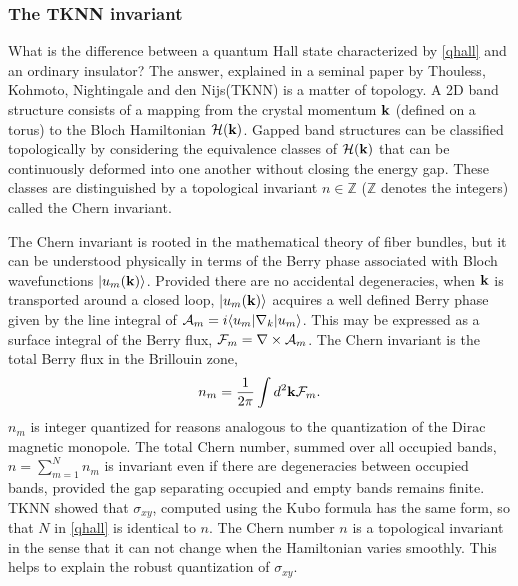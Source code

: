 \documentclass[twocolumn,floatfix,showpacs,rmp,aps]{revtex4}
\begin{document}
	\subsubsection{The TKNN invariant}
	\label{sec:tknn}
	
	What is the difference between a
	quantum Hall state characterized by \eqref{qhall} and an ordinary insulator?
	The answer, explained in a seminal \citeyear{thouless82} paper by
	Thouless, Kohmoto, Nightingale and den Nijs(TKNN) is a matter of topology.
	A 2D band structure consists of a
	mapping from the crystal momentum ${\bf k}$ (defined on a torus)
	to the Bloch Hamiltonian ${\cal H}({\bf k})$.
	Gapped band structures can
	be classified topologically by considering the equivalence classes of
	${\cal H}({\bf k})$ that can be continuously deformed into one another
	without closing the energy gap.  These classes are distinguished by a
	topological invariant $n \in \mathbb{Z}$ ($\mathbb{Z}$ denotes the integers)
	called the Chern invariant.
	
	The Chern invariant is rooted in the mathematical
	theory of fiber bundles\cite{nakahara90}, but it
	can be understood physically in terms of the Berry phase\cite{berry84} associated
	with Bloch wavefunctions $|u_m({\bf k})\rangle$.  Provided
	there are no accidental degeneracies, when ${\bf k}$ is transported around a
	closed loop, $|u_m({\bf k})\rangle$ acquires a well defined Berry phase given by the
	line integral of ${\cal A}_m = i\langle u_m|\nabla_k|u_m\rangle$.
	This may be expressed as a surface integral of the Berry
	flux, ${\cal F}_m = \nabla\times{\cal A}_m$.  The Chern invariant is the total
	Berry flux in the Brillouin zone,
	\begin{equation}
		n_m = \frac{1}{2\pi} \int d^2{\bf k} {\cal F}_m.
		\label{chern}
	\end{equation}
	$n_m$ is integer quantized for reasons analogous to the quantization of the
	Dirac magnetic monopole.  The total Chern number, summed over all occupied bands,
	$n = \sum_{m=1}^N n_m$
	is invariant even if there are degeneracies between
	occupied bands, provided the gap separating occupied and empty bands remains
	finite.
	TKNN showed that $\sigma_{xy}$, computed using the Kubo formula
	has the same form, so that $N$ in \eqref{qhall} is identical to
	$n$.  The Chern number $n$ is a topological
	invariant in the sense that it can not change when the Hamiltonian
	varies smoothly.   This helps
	to explain the robust quantization of $\sigma_{xy}$.
	
\end{document}
